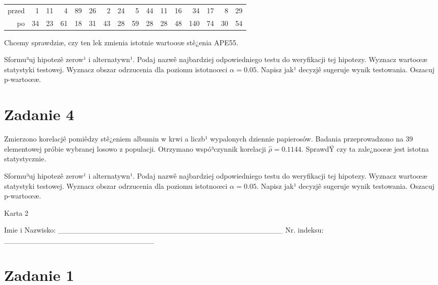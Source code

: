 \documentclass[a4paper,12pt]{article}
\begin{document}
  \vspace{0.5cm} 
  \noindent\begin{center} 
\begin{tabular}{rrrrrrrrrrrrrrrr}
  \hline
  \hline
przed & 1 & 11 & 4 & 89 & 26 & 2 & 24 & 5 & 44 & 11 & 16 & 34 & 17 & 8 & 29 \\
  po & 34 & 23 & 61 & 18 & 31 & 43 & 28 & 59 & 28 & 28 & 48 & 140 & 74 & 30 & 54 \\
   \hline
\end{tabular}
 
  \end{center} 
  \vspace{0.5cm}
  
  Chcemy sprawdziæ, czy ten lek zmienia istotnie wartoœæ stê¿enia APE55.
  
  Sformu³uj hipotezê zerow¹ i alternatywn¹. 
  Podaj nazwê najbardziej odpowiedniego testu do weryfikacji tej hipotezy. 
  Wyznacz wartoœæ statystyki testowej. 
  Wyznacz obszar odrzucenia dla poziomu istotnoœci $\alpha=0.05$. 
  Napisz jak¹ decyzjê sugeruje wynik testowania. Oszacuj p-wartoœæ. \vspace{1cm} 

  \section*{Zadanie 4}
     
     Zmierzono korelacjê pomiêdzy stê¿eniem albumin w krwi a liczb¹ wypalonych dziennie papierosów. 
     Badania przeprowadzono na 39 elementowej próbie wybranej losowo z populacji. 
     Otrzymano wspó³czynnik korelacji $\hat\rho = 0.1144 $. 
     SprawdŸ czy ta zale¿noœæ jest istotna statystycznie. 
     
     Sformu³uj hipotezê zerow¹ i alternatywn¹. 
     Podaj nazwê najbardziej odpowiedniego testu do weryfikacji tej hipotezy. 
     Wyznacz wartoœæ statystyki testowej. 
     Wyznacz obszar odrzucenia dla poziomu istotnoœci $\alpha=0.05$. 
     Napisz jak¹ decyzjê sugeruje wynik testowania. 
     Oszacuj p-wartoœæ. \vspace{1cm} 

  \clearpage  Karta  2  

 Imie i Nazwisko: \_\_\_\_\_\_\_\_\_\_\_\_\_\_\_\_\_\_\_\_\_\_\_\_\_\_\_\_\_\_\_\_\_\_\_\_\_\_\_\_\_\_ Nr. indeksu: \_\_\_\_\_\_\_\_\_\_\_\_\_\_\_\_\_\_\_\_\_\_\_\_\_\_\_\_ 
 \section*{Zadanie 1}
     
\end{document}
